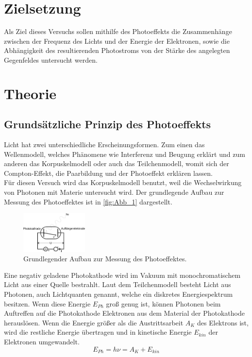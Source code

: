 \section{Zielsetzung}
\label{sec:Zielsetzung}
Als Ziel dieses Versuchs sollen mithilfe des Photoeffekts die Zusammenhänge zwischen der Frequenz
des Lichts und der Energie der Elektronen, sowie die Abhängigkeit des resultierenden
Photostroms von der Stärke des angelegten Gegenfeldes untersucht werden.
\section{Theorie}
\label{sec:Theorie}
\subsection{Grundsätzliche Prinzip des Photoeffekts}
\label{Grundsätzliche_theo}
Licht hat zwei unterschiedliche Erscheinungsformen. Zum einen das Wellenmodell,
welches Phänomene wie Interferenz und Beugung erklärt und zum anderen das Korpuskelmodell oder
auch das Teilchenmodell, womit sich der Compton-Effekt, die Paarbildung und der Photoeffekt erklären lassen.\\
Für diesen Versuch wird das Korpuskelmodell benutzt, weil die Wechselwirkung von Photonen mit Materie untersucht wird.
Der grundlegende Aufbau zur Messung des Photoeffektes ist in \autoref{fig:Abb_1} dargestellt.
\begin{figure}[H]
    \centering
    \includegraphics[width=0.3\textwidth]{build/Abb_1.pdf}
    \caption{Grundlegender Aufbau zur Messung des Photoeffektes.\cite{V500}}
    \label{fig:Abb_1}
\end{figure}
Eine negativ geladene Photokathode wird im Vakuum mit monochromatischem Licht aus einer Quelle bestrahlt.
Laut dem Teilchenmodell besteht Licht aus Photonen, auch Lichtquanten genannt, welche ein diskretes
Energiespektrum besitzen. Wenn diese Energie $E_{Ph}$ groß genug ist, können Photonen beim Auftreffen auf die Photokathode
Elektronen aus dem Material der Photokathode herauslösen.
Wenn die Energie größer als die Austrittsarbeit $A_K$ des Elektrons ist, wird die restliche Energie übertragen 
und in kinetische Energie $E_{kin}$ der Elektronen umgewandelt.
\begin{equation}
    E_{Ph} = h\nu = A_K + E_{kin}
    \label{eqn:Energie}
\end{equation}
